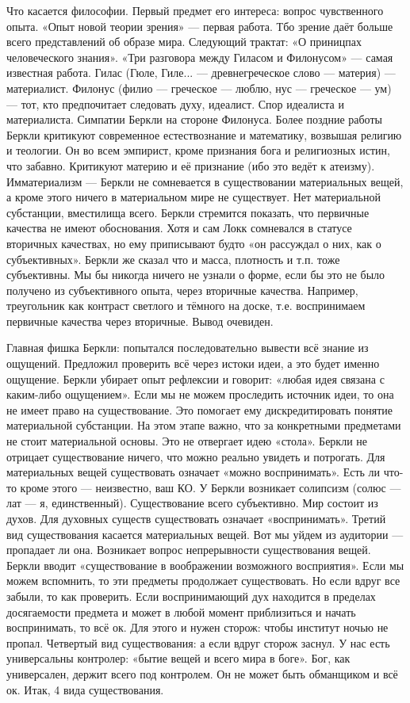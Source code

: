 Что касается философии. Первый предмет его интереса: вопрос чувственного опыта. «Опыт новой теории зрения» --- первая работа. Тбо зрение даёт больше всего представлений об образе мира. Следующий трактат: «О приницпах человеческого знания». «Три разговора между Гиласом и Филонусом» --- самая известная работа. 
Гилас (Гюле, Гиле... --- древнегреческое слово --- материя) --- материалист. Филонус (филио --- греческое --- люблю, нус --- греческое --- ум) --- тот, кто предпочитает следовать духу, идеалист. Спор идеалиста и материалиста. Симпатии Беркли на стороне Филонуса.
Более поздние работы Беркли критикуют современное естествознание и математику, возвышая религию и теологии.
Он во всем эмпирист, кроме признания бога и религиозных истин, что забавно. Критикуют материю и её признание (ибо это ведёт к атеизму). Имматериализм --- Беркли не сомневается в существовании материальных вещей, а кроме этого ничего в материальном мире не существует. Нет материальной субстанции, вместилища всего.
Беркли стремится показать, что первичные качества не имеют обоснования. Хотя и сам Локк сомневался в статусе вторичных качествах, но ему приписывают будто «он рассуждал о них, как о субъективных». Беркли же сказал что и масса, плотность и т.п. тоже субъективны. Мы бы никогда ничего не узнали о форме, если бы это не было получено из субъективного опыта, через вторичные качества. Например, треугольник как контраст светлого и тёмного на доске, т.е. воспринимаем первичные качества через вторичные. Вывод очевиден.

Главная фишка Беркли: попытался последовательно вывести всё знание из ощущений. Предложил проверить всё через истоки идеи, а это будет именно ощущение. Беркли убирает опыт рефлексии и говорит: «любая идея связана с каким-либо ощущением». Если мы не можем проследить источник идеи, то она не имеет право на существование. Это помогает ему дискредитировать понятие материальной субстанции.
На этом этапе важно, что за конкретными предметами не стоит материальной основы. Это не отвергает идею «стола». Беркли не отрицает существование ничего, что можно реально увидеть и потрогать. Для материальных вещей существовать означает «можно воспринимать». Есть ли что-то кроме этого --- неизвестно, ваш КО.
У Беркли возникает солипсизм (солюс --- лат --- я, единственный). Существование всего субъективно. Мир состоит из духов. Для духовных существ существовать означает «воспринимать». 
Третий вид существования касается материальных вещей. Вот мы уйдем из аудитории --- пропадает ли она. Возникает вопрос непрерывности существования вещей. Беркли вводит «существование в воображении возможного восприятия». Если мы можем вспомнить, то эти предметы продолжает существовать. Но если вдруг все забыли, то как проверить. Если воспринимающий дух находится в пределах досягаемости предмета и может в любой момент приблизиться и начать воспринимать, то всё ок. Для этого и нужен сторож: чтобы институт ночью не пропал. 
Четвертый вид существования: а если вдруг сторож заснул. У нас есть универсальны контролер: «бытие вещей и всего мира в боге». Бог, как универсален, держит всего под контролем. Он не может быть обманщиком и всё ок. Итак, 4 вида существования.

